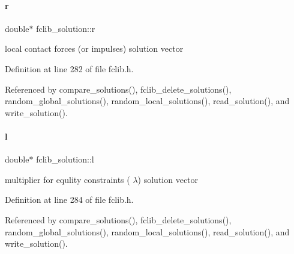 \mbox{\label{structfclib__solution_aba0437aebbb1060350ef2f0a6e8b504d}} 
\paragraph{\texorpdfstring{r}{r}}
{\footnotesize\ttfamily double$\ast$ fclib\+\_\+solution\+::r}



local contact forces (or impulses) solution vector 



Definition at line 282 of file fclib.\+h.



Referenced by compare\+\_\+solutions(), fclib\+\_\+delete\+\_\+solutions(), random\+\_\+global\+\_\+solutions(), random\+\_\+local\+\_\+solutions(), read\+\_\+solution(), and write\+\_\+solution().

\mbox{\label{structfclib__solution_a872a687856540dd19286aec43d890ede}} 
\paragraph{\texorpdfstring{l}{l}}
{\footnotesize\ttfamily double$\ast$ fclib\+\_\+solution\+::l}



multiplier for equlity constraints ( $\lambda$) solution vector 



Definition at line 284 of file fclib.\+h.



Referenced by compare\+\_\+solutions(), fclib\+\_\+delete\+\_\+solutions(), random\+\_\+global\+\_\+solutions(), random\+\_\+local\+\_\+solutions(), read\+\_\+solution(), and write\+\_\+solution().

